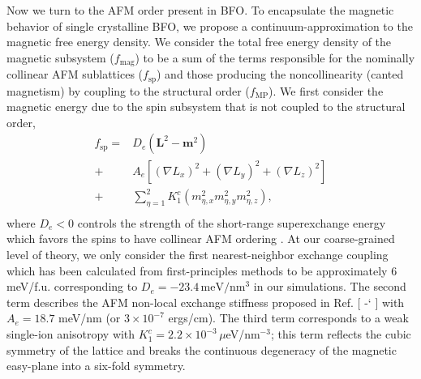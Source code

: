 \documentclass[%
 reprint,
superscriptaddress,
 amsmath,amssymb,
prb,
]{revtex4-1}
\newcommand*{\citen}[1]{%
  \begingroup
    \romannumeral-`\x %
    \setcitestyle{numbers}%
    \cite{#1}%
  \endgroup   
}
\begin{document}
Now we turn to the AFM order present in BFO. 
%
To encapsulate the magnetic behavior of single crystalline BFO, we propose a continuum-approximation to the magnetic free energy density. 
%
We consider the total free energy density of the magnetic subsystem ($f_\mathrm{mag}$) to be a sum of the terms responsible for the nominally collinear AFM sublattices ($f_\mathrm{sp}$) and those producing the noncollinearity (canted magnetism) by coupling to the structural order ($f_\mathrm{MP}$).
%
We first consider the magnetic energy due to the spin subsystem that is not coupled to the structural order,
%
\begin{equation}\label{eqn:AFM}
\begin{aligned}
    f_\mathrm{sp} =& D_e \left(\mathbf{L}^2 - \mathbf{m}^2\right) \\
    +& A_e \left[\left(\nabla L_x\right)^2 + \left(\nabla L_y\right)^2 + \left(\nabla L_z\right)^2\right] \\
    +&\sum\limits_{\eta = 1}^2 K_1^c \left(m_{\eta,x}^2 m_{\eta,y}^2 m_{\eta,z}^2\right), \\
\end{aligned}
\end{equation}
%
where $D_e < 0$ controls the strength of the short-range superexchange energy which favors the spins to have collinear AFM ordering \cite{Rezende2019}.
%
At our coarse-grained level of theory, we only consider the first nearest-neighbor exchange coupling which has been calculated from first-principles methods\cite{Xu2019} to be approximately 6 meV/f.u. corresponding to $D_e = -23.4 \,\mathrm{meV}/\mathrm{nm}^3$ in our simulations.
%
The second term describes the AFM non-local exchange stiffness proposed in Ref. [\citen{Agbelele2017}] with $A_e = 18.7$ meV/nm (or $3\times10^{-7}$ ergs/cm).
%
The third term corresponds to a weak single-ion anisotropy \cite{Weingart2012} with $K_1^c = 2.2 \times 10^{-3} \,\mu$eV/$\mathrm{nm}^{-3}$; this term reflects the cubic symmetry of the lattice and breaks the continuous degeneracy of the magnetic easy-plane into a six-fold symmetry.
%
\end{document}
